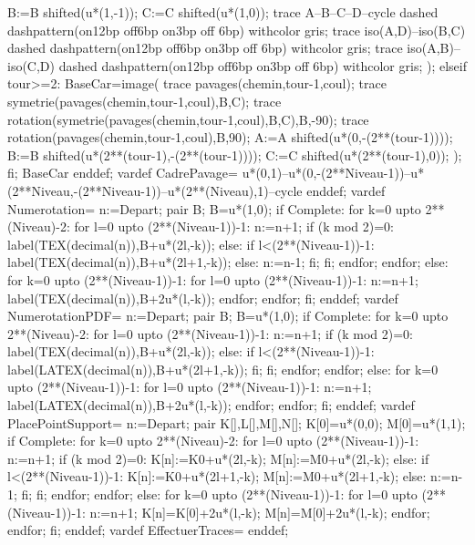 {      B:=B shifted(u*(1,-1));
      C:=C shifted(u*(1,0));
      trace A--B--C--D--cycle dashed dashpattern(on12bp off6bp on3bp off 6bp) withcolor gris;
      trace iso(A,D)--iso(B,C) dashed dashpattern(on12bp off6bp on3bp off 6bp) withcolor gris;
      trace iso(A,B)--iso(C,D) dashed dashpattern(on12bp off6bp on3bp off 6bp) withcolor gris;
      );
  elseif tour>=2:
    BaseCar=image(
      trace pavages(chemin,tour-1,coul);
      trace symetrie(pavages(chemin,tour-1,coul),B,C);%
      trace rotation(symetrie(pavages(chemin,tour-1,coul),B,C),B,-90);
      trace rotation(pavages(chemin,tour-1,coul),B,90);
      A:=A shifted(u*(0,-(2**(tour-1))));
      B:=B shifted(u*(2**(tour-1),-(2**(tour-1))));
      C:=C shifted(u*(2**(tour-1),0));
      );
  fi;
  BaseCar
  enddef;
  vardef CadrePavage=
  u*(0,1)--u*(0,-(2**Niveau-1))--u*(2**Niveau,-(2**Niveau-1))--u*(2**(Niveau),1)--cycle
  enddef;
  vardef Numerotation=
  n:=Depart;
  pair B;
  B=u*(1,0);
  if Complete:
  for k=0 upto 2**(Niveau)-2:
  for l=0 upto (2**(Niveau-1))-1:
  n:=n+1;
  if (k mod 2)=0:
  label(TEX(decimal(n)),B+u*(2l,-k));
  else:
  if l<(2**(Niveau-1))-1:
  label(TEX(decimal(n)),B+u*(2l+1,-k));
  else:
  n:=n-1;
  fi;
  fi;
  endfor;
  endfor;
  else:
  for k=0 upto (2**(Niveau-1))-1:
  for l=0 upto (2**(Niveau-1))-1:
  n:=n+1;
  label(TEX(decimal(n)),B+2u*(l,-k));
  endfor;
  endfor;
  fi;
  enddef;
  vardef NumerotationPDF=
  n:=Depart;
  pair B;
  B=u*(1,0);
  if Complete:
  for k=0 upto 2**(Niveau)-2:
  for l=0 upto (2**(Niveau-1))-1:
  n:=n+1;
  if (k mod 2)=0:
  label(TEX(decimal(n)),B+u*(2l,-k));
  else:
  if l<(2**(Niveau-1))-1:
  label(LATEX(decimal(n)),B+u*(2l+1,-k));
  fi;
  fi;
  endfor;
  endfor;
  else:
  for k=0 upto (2**(Niveau-1))-1:
  for l=0 upto (2**(Niveau-1))-1:
  n:=n+1;
  label(LATEX(decimal(n)),B+2u*(l,-k));
  endfor;
  endfor;
  fi;
  enddef;
  vardef PlacePointSupport=
  n:=Depart;
  pair K[],L[],M[],N[];
  K[0]=u*(0,0);
  M[0]=u*(1,1);
  if Complete:
  for k=0 upto 2**(Niveau)-2:
  for l=0 upto (2**(Niveau-1))-1:
  n:=n+1;
  if (k mod 2)=0:
  K[n]:=K0+u*(2l,-k);
  M[n]:=M0+u*(2l,-k);
  else:
  if l<(2**(Niveau-1))-1:
  K[n]:=K0+u*(2l+1,-k);
  M[n]:=M0+u*(2l+1,-k);
  else:
  n:=n-1;
  fi;
  fi;
  endfor;
  endfor;
  else:
  for k=0 upto (2**(Niveau-1))-1:
  for l=0 upto (2**(Niveau-1))-1:
  n:=n+1;
  K[n]=K[0]+2u*(l,-k);
  M[n]=M[0]+2u*(l,-k);
  endfor;
  endfor;
  fi;
  enddef;
  vardef EffectuerTraces=
  enddef;
}

